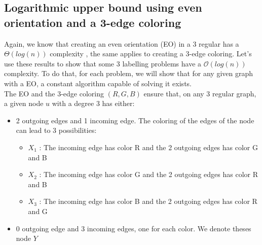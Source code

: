 \subsection{Logarithmic upper bound using even orientation and a 3-edge coloring}
Again, we know that creating an even orientation (EO) in a 3 regular has a $\Theta(log(n))$ complexity \cite{1}, the same applies to creating a 3-edge coloring. Let's use these results to show that some 3 labelling problems have a $\mathcal{O}(log(n))$ complexity. To do that, for each problem, we will show that for any given graph with a EO, a constant algorithm capable of solving it exists.\\
The EO and the 3-edge coloring $(R,G,B)$ ensure that, on any 3 regular graph, a given node $u$ with a degree 3 has either:
\begin{itemize}
    \item 2 outgoing edges and 1 incoming edge.
    The coloring of the edges of the node can lead to 3 possibilities:
    \begin{itemize}
        \item $X_1$ : The incoming edge has color R and the 2 outgoing edges has color G and B
        \item $X_2$ : The incoming edge has color G and the 2 outgoing edges has color R and B
        \item $X_3$ : The incoming edge has color B and the 2 outgoing edges has color R and G
    \end{itemize}
    \item 0 outgoing edge and 3 incoming edges, one for each color. We denote theses node $Y$
\end{itemize}
